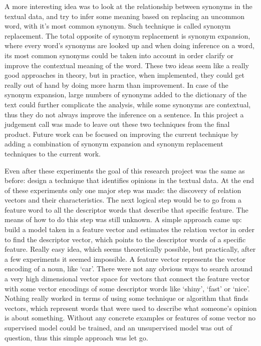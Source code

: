 \documentclass{sig-alternate}
\begin{document}
A more interesting idea was to look at the relationship between synonyms in the textual data, and try to infer some meaning based on replacing an uncommon word, with it's most common synonym. Such technique is called synonym replacement. The total opposite of synonym replacement is synonym expansion, where every word's synonyms are looked up and when doing inference on a word, its most common synonyms could be taken into account in order clarify or improve the contextual meaning of the word. These two ideas seem like a really good approaches in theory, but in practice, when implemented, they could get really out of hand by doing more harm than improvement. In case of the synonym expansion, large numbers of synonyms added to the dictionary of the text could further complicate the analysis, while some synonyms are contextual, thus they do not always improve the inference on a sentence. In this project a judgement call was made to leave out these two techniques from the final product. Future work can be focused on improving the current technique by adding a combination of synonym expansion and synonym replacement techniques to the current work.

Even after these experiments the goal of this research project was the same as before: design a technique that identifies opinions in the textual data. At the end of these experiments only one major step was made: the discovery of relation vectors and their characteristics. The next logical step would be to go from a feature word to all the descriptor words that describe that specific feature. The means of how to do this step was still unknown. A simple approach came up: build a model taken in a feature vector and estimates the relation vector in order to find the descriptor vector, which points to the descriptor words of a specific feature. Really easy idea, which seems theoretically possible, but practically, after a few experiments it seemed impossible. A feature vector represents the vector encoding of a noun, like `car'. There were not any obvious ways to search around a very high dimensional vector space for vectors that connect the feature vector with some vector encodings of some descriptor words like `shiny', `fast' or `nice'. Nothing really worked in terms of using some technique or algorithm that finds vectors, which represent words that were used to describe what someone's opinion is about something. Without any concrete examples or features of some vector no supervised model could be trained, and an unsupervised model was out of question, thus this simple approach was let go. 
\end{document}
